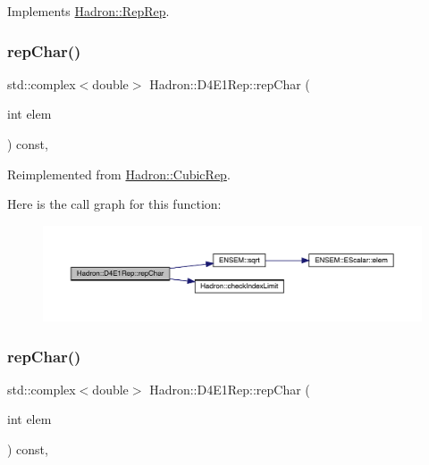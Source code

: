 Implements \mbox{\hyperlink{structHadron_1_1RepRep_ab3213025f6de249f7095892109575fde}{Hadron\+::\+Rep\+Rep}}.

\mbox{\label{structHadron_1_1D4E1Rep_a5c4eb87d8e59c8653c6d4da163c300ea}} 
\subsubsection{\texorpdfstring{repChar()}{repChar()}\hspace{0.1cm}{\footnotesize\ttfamily [1/3]}}
{\footnotesize\ttfamily std\+::complex$<$double$>$ Hadron\+::\+D4\+E1\+Rep\+::rep\+Char (\begin{DoxyParamCaption}\item[{int}]{elem }\end{DoxyParamCaption}) const\hspace{0.3cm}{\ttfamily [inline]}, {\ttfamily [virtual]}}



Reimplemented from \mbox{\hyperlink{structHadron_1_1CubicRep_af45227106e8e715e84b0af69cd3b36f8}{Hadron\+::\+Cubic\+Rep}}.

Here is the call graph for this function\+:
\nopagebreak
\begin{figure}[H]
\begin{center}
\leavevmode
\includegraphics[width=350pt]{da/d78/structHadron_1_1D4E1Rep_a5c4eb87d8e59c8653c6d4da163c300ea_cgraph}
\end{center}
\end{figure}
\mbox{\label{structHadron_1_1D4E1Rep_a5c4eb87d8e59c8653c6d4da163c300ea}} 
\subsubsection{\texorpdfstring{repChar()}{repChar()}\hspace{0.1cm}{\footnotesize\ttfamily [2/3]}}
{\footnotesize\ttfamily std\+::complex$<$double$>$ Hadron\+::\+D4\+E1\+Rep\+::rep\+Char (\begin{DoxyParamCaption}\item[{int}]{elem }\end{DoxyParamCaption}) const\hspace{0.3cm}{\ttfamily [inline]}, {\ttfamily [virtual]}}



